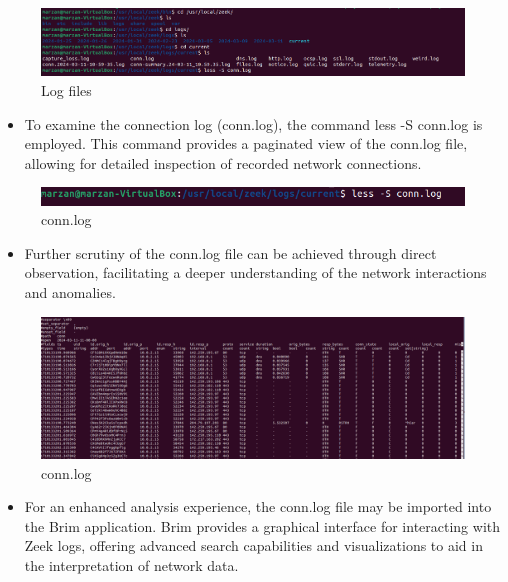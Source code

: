 \begin{figure}[H]
    \centering
    \includegraphics[width=1\linewidth]{images/live_monitor/live_logs.png}
    \caption{Log files}
    \label{fig:enter-label}
\end{figure}

\begin{itemize}
    \item To examine the connection log (conn.log), the command less -S conn.log is employed. This command provides a paginated view of the conn.log file, allowing for detailed inspection of recorded network connections.
\end{itemize}


\begin{figure}[H]
    \centering
    \includegraphics[width=1\linewidth]{images/live_monitor/less_conn_live.png}
    \caption{conn.log}
    \label{fig:enter-label}
\end{figure}

\begin{itemize}
    \item Further scrutiny of the conn.log file can be achieved through direct observation, facilitating a deeper understanding of the network interactions and anomalies.
\end{itemize}


\begin{figure}[H]
    \centering
    \includegraphics[width=1\linewidth]{images/new_1.png}
    \caption{conn.log}
    \label{fig:enter-label}
\end{figure}

\begin{itemize}
    \item For an enhanced analysis experience, the conn.log file may be imported into the Brim application. Brim provides a graphical interface for interacting with Zeek logs, offering advanced search capabilities and visualizations to aid in the interpretation of network data.
\end{itemize}

